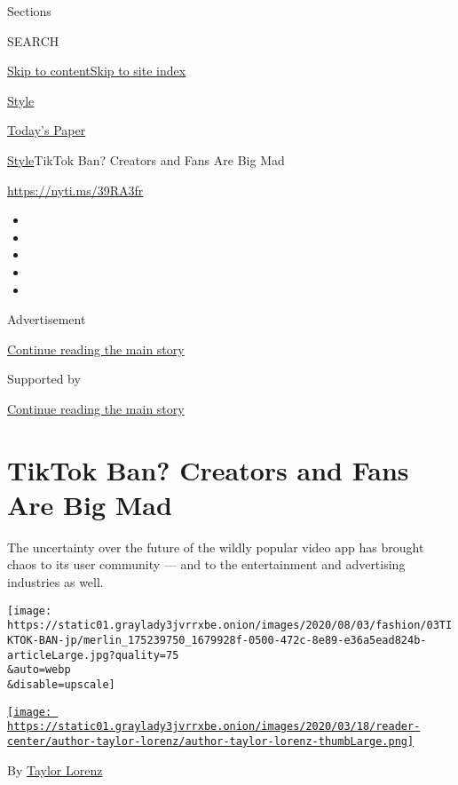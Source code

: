 Sections

SEARCH

\protect\hyperlink{site-content}{Skip to
content}\protect\hyperlink{site-index}{Skip to site index}

\href{https://www.nytimes3xbfgragh.onion/section/style}{Style}

\href{https://myaccount.nytimes3xbfgragh.onion/auth/login?response_type=cookie\&client_id=vi}{}

\href{https://www.nytimes3xbfgragh.onion/section/todayspaper}{Today's
Paper}

\href{/section/style}{Style}\textbar{}TikTok Ban? Creators and Fans Are
Big Mad

\href{https://nyti.ms/39RA3fr}{https://nyti.ms/39RA3fr}

\begin{itemize}
\item
\item
\item
\item
\item
\end{itemize}

Advertisement

\protect\hyperlink{after-top}{Continue reading the main story}

Supported by

\protect\hyperlink{after-sponsor}{Continue reading the main story}

\hypertarget{tiktok-ban-creators-and-fans-are-big-mad}{%
\section{TikTok Ban? Creators and Fans Are Big
Mad}\label{tiktok-ban-creators-and-fans-are-big-mad}}

The uncertainty over the future of the wildly popular video app has
brought chaos to its user community --- and to the entertainment and
advertising industries as well.

\texttt{[image: https://static01.graylady3jvrrxbe.onion/images/2020/08/03/fashion/03TIKTOK-BAN-jp/merlin\_175239750\_1679928f-0500-472c-8e89-e36a5ead824b-articleLarge.jpg?quality=75\\\&auto=webp\\\&disable=upscale]}

\href{https://www.nytimes3xbfgragh.onion/by/taylor-lorenz}{\texttt{[image: https://static01.graylady3jvrrxbe.onion/images/2020/03/18/reader-center/author-taylor-lorenz/author-taylor-lorenz-thumbLarge.png]}}

By \href{https://www.nytimes3xbfgragh.onion/by/taylor-lorenz}{Taylor
Lorenz}

